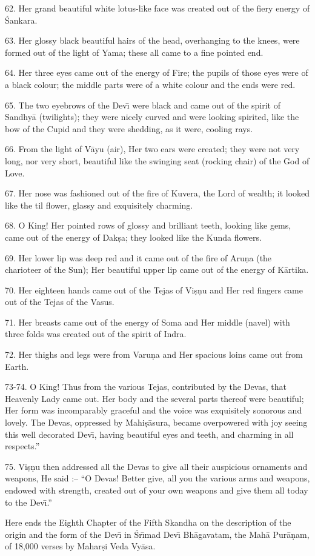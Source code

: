 62. Her grand beautiful white lotus-like face was created out of the fiery energy of \'Sankara.

63. Her glossy black beautiful hairs of the head, overhanging to the knees, were formed out of the light of Yama; these all came to a fine pointed end.

64. Her three eyes came out of the energy of Fire; the pupils of those eyes were of a black colour; the middle parts were of a white colour and the ends were red.

65. The two eyebrows of the Dev\={\i} were black and came out of the spirit of Sandhy\=a (twilights); they were nicely curved and were looking spirited, like the bow of the Cupid and they were shedding, as it were, cooling rays.

66. From the light of V\=ayu (air), Her two ears were created; they were not very long, nor very short, beautiful like the swinging seat (rocking chair) of the God of Love.

67. Her nose was fashioned out of the fire of Kuvera, the Lord of wealth; it looked like the til flower, glassy and exquisitely charming.

68. O King! Her pointed rows of glossy and brilliant teeth, looking like gems, came out of the energy of Dak\d{s}a; they looked like the Kunda flowers.

69. Her lower lip was deep red and it came out of the fire of Aru\d{n}a (the charioteer of the Sun); Her beautiful upper lip came out of the energy of K\=artika.

70. Her eighteen hands came out of the Tejas of Vi\d{s}\d{n}u and Her red fingers came out of the Tejas of the Vasus.

71. Her breasts came out of the energy of Soma and Her middle (navel) with three folds was created out of the spirit of Indra.

72. Her thighs and legs were from Varu\d{n}a and Her spacious loins came out from Earth.

73-74. O King! Thus from the various Tejas, contributed by the Devas, that Heavenly Lady came out. Her body and the several parts thereof were beautiful; Her form was incomparably graceful and the voice was exquisitely sonorous and lovely. The Devas, oppressed by Mahi\d{s}\=asura, became overpowered with joy seeing this well decorated Dev\={\i}, having beautiful eyes and teeth, and charming in all respects.''

75. Vi\d{s}\d{n}u then addressed all the Devas to give all their auspicious ornaments and weapons, He said :-- ``O Devas! Better give, all you the various arms and weapons, endowed with strength, created out of your own weapons and give them all today to the Dev\={\i}.''

Here ends the Eighth Chapter of the Fifth Skandha on the description of the origin and the form of the Dev\={\i} in \'Sr\={\i}mad Dev\={\i} Bh\=agavatam, the Mah\=a Pur\=a\d{n}am, of 18,000 verses by Mahar\d{s}i Veda Vy\=asa.



